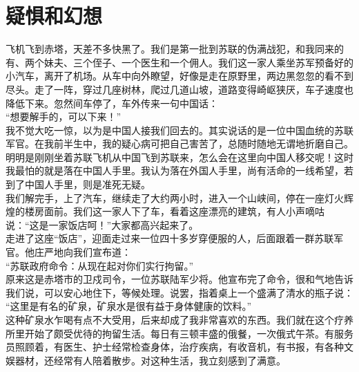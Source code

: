 \fancyhead[RO]{} %
\fancyhead[LE]{} %
\chapter*{疑惧和幻想}
\thispagestyle{empty}
飞机飞到赤塔，天差不多快黑了。我们是第一批到苏联的伪满战犯，和我同来的有、两个妹夫、三个侄子、一个医生和一个佣人。我们这一家人乘坐苏军预备好的小汽车，离开了机场。从车中向外瞭望，好像是走在原野里，两边黑忽忽的看不到尽头。走了一阵，穿过几座树林，爬过几道山坡，道路变得崎岖狭厌，车子速度也降低下来。忽然间车停了，车外传来一句中国话：\\

“想要解手的，可以下来！”\\

我不觉大吃一惊，以为是中国人接我们回去的。其实说话的是一位中国血统的苏联军官。在我前半生中，我的疑心病可把自己害苦了，总随时随地无谓地折磨自己。明明是刚刚坐着苏联飞机从中国飞到苏联来，怎么会在这里向中国人移交呢！这时我最怕的就是落在中国人手里。我认为落在外国人手里，尚有活命的一线希望，若到了中国人手里，则是准死无疑。\\

我们解完手，上了汽车，继续走了大约两小时，进入一个山峡间，停在一座灯火辉煌的楼房面前。我们这一家人下了车，看着这座漂亮的建筑，有人小声嘀咕说：“这是一家饭店呵！”大家都高兴起来了。\\

走进了这座“饭店”，迎面走过来一位四十多岁穿便服的人，后面跟着一群苏联军官。他庄严地向我们宣布道：\\

“苏联政府命令：从现在起对你们实行拘留。”\\

原来这是赤塔市的卫戍司令，一位苏联陆军少将。他宣布完了命令，很和气地告诉我们说，可以安心地住下，等候处理。说罢，指着桌上一个盛满了清水的瓶子说：\\

“这里是有名的矿泉，矿泉水是很有益于身体健康的饮料。”\\

这种矿泉水乍喝有点不大受用，后来却成了我非常喜欢的东西。我们就在这个疗养所里开始了颇受优待的拘留生活。每日有三顿丰盛的俄餐，一次俄式午茶。有服务员照顾着，有医生、护士经常检查身体，治疗疾病，有收音机，有书报，有各种文娱器材，还经常有人陪着散步。对这种生活，我立刻感到了满意。\\

